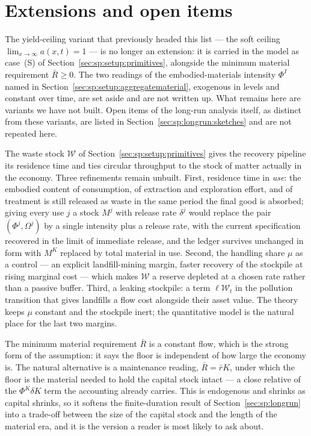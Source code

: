 \section{Extensions and open items}\label{sec:app:extensions}

The yield-ceiling variant that previously headed this list --- the soft ceiling
$\lim_{x\to\infty}a\left(x,t\right)=1$ --- is no longer an extension: it is carried in the model as
case~(S) of Section~\ref{sec:sp:setup:primitives}, alongside the minimum material requirement
$\bar R\ge0$. The two readings of the embodied-materials intensity $\Phi^I$ named in
Section~\ref{sec:sp:setup:aggregatematerial}, exogenous in levels and constant over time, are set
aside and are not written up. What remains here are variants we have not built. Open items of the
long-run analysis itself, as distinct from these variants, are listed in
Section~\ref{sec:sp:longrun:sketches} and are not repeated here.

 The waste stock $\mathcal W$ of
Section~\ref{sec:sp:setup:primitives} gives the recovery pipeline its residence time and ties
circular throughput to the stock of matter actually in the economy. Three refinements remain
unbuilt. First, residence time in \emph{use}: the embodied content of consumption, of extraction and
exploration effort, and of treatment is still released as waste in the same period the final good is
absorbed; giving every use $j$ a stock $M^j$ with release rate $\delta^j$ would replace the pair
$\left(\Phi^j,\Omega^j\right)$ by a single intensity plus a release rate, with the current
specification recovered in the limit of immediate release, and the ledger survives unchanged in form
with $M^K$ replaced by total material in use. Second, the handling share $\mu$ as a control --- an
explicit landfill-mining margin, faster recovery of the stockpile at rising marginal cost --- which
makes $\mathcal W$ a reserve depleted at a chosen rate rather than a passive buffer. Third, a
leaking stockpile: a term $\ell\mathcal W_t$ in the pollution transition that gives landfills a flow
cost alongside their asset value. The theory keeps $\mu$ constant and the stockpile inert; the
quantitative model is the natural place for the last two margins.

 The minimum material requirement $\bar R$ is a
constant flow, which is the strong form of the assumption: it says the floor is independent of how
large the economy is. The natural alternative is a maintenance reading, $\bar R=\bar r K$, under which
the floor is the material needed to hold the capital stock intact --- a close relative of the
$\Phi^K\delta K$ term the accounting already carries. This is endogenous and shrinks as capital
shrinks, so it softens the finite-duration result of Section~\ref{sec:sp:longrun} into a trade-off
between the size of the capital stock and the length of the material era, and it is the version a
reader is most likely to ask about.

